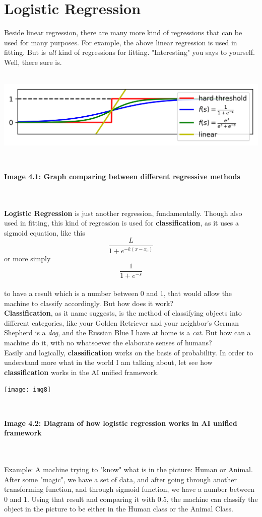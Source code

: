 \documentclass{article}
\begin{document}
	\section{Logistic Regression}
	Beside linear regression, there are many more kind of regressions that can be used for many purposes. For example, the above linear regression is used in fitting. But is \textit{all} kind of regressions for fitting. "Interesting" you says to yourself. Well, there sure is.\\\\
\centerline{\includegraphics[scale=0.7]{img6}}\\
\centerline{\small{\textbf{ Image 4.1: Graph comparing between different regressive methods}}}\\\\ 
\tab\tab \textbf{Logistic Regression} is just another regression, fundamentally. Though also used in fitting, this kind of regression is used for \textbf{classification}, as it uses a sigmoid equation, like this $$\frac{L}{1 + e^{-k(x-x_0)}}$$
\tab or more simply $$\frac{1}{1 + e^{-s}}$$\\
\tab\tab to have a result which is a number between 0 and 1, that would allow the machine to classify accordingly. But how does it work? \\
\tab \tab \textbf{Classification}, as it name suggests, is the method of classifying objects into different categories, like your Golden Retriever and your neighbor's German Shepherd is a \textit{dog}, and the Russian Blue I have at home is a \textit{cat}. But how can a machine do it, with no whatsoever the elaborate senses of humans?\\
\tab\tab Easily and logically, \textbf{classification} works on the basis of probability. In order to understand more what in the world I am talking about, let see how \textbf{classification} works in the AI unified framework. \\
\centerline{\texttt{[image: img8]}}\\
\centerline{\small{\textbf{ Image 4.2: Diagram of how logistic regression works in AI unified framework}}}\\\\
\tab\tab Example: A machine trying to "know" what is in the picture: Human or Animal. After some "magic", we have a set of data, and after going through another transforming function, and through sigmoid function, we have a number between 0 and 1. Using that result and comparing it with 0.5, the machine can classify the object in the picture to be either in the Human class or the Animal Class.
\end{document}
